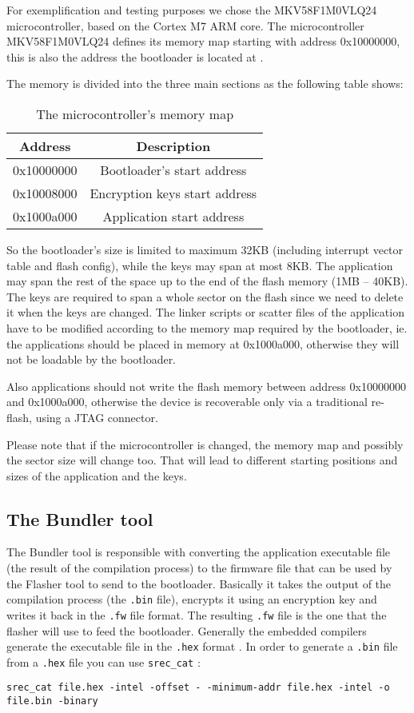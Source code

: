 \documentclass[10pt,a4paper,twoside]{article}
\begin{document}
For exemplification and testing purposes we chose the MKV58F1M0VLQ24 microcontroller, based on the Cortex M7 ARM core. The microcontroller MKV58F1M0VLQ24 defines its memory map starting with address 0x10000000, this is also the address the bootloader is located at \cite{kv5x}.

The memory is divided into the three main sections as the following table shows:
\begin{table}[h]
\begin{tabular}{ | c | c | }
        \hline
       \textbf{Address} & \textbf{Description} \\ \hline
0x10000000 & Bootloader’s start address \\ \hline
0x10008000 & Encryption keys start address \\ \hline
0x1000a000 & Application start address \\ \hline
    \end{tabular}
        \centering
    \caption{The microcontroller's memory map}
    \label{protoStruct}
\end{table}

So the bootloader’s size is limited to maximum 32KB (including interrupt vector table and flash config), while the keys may span at most 8KB. The application may span the rest of the space up to the end of the flash memory (1MB – 40KB).
The keys are required to span a whole sector on the flash since we need to delete it when the keys are changed.
The linker scripts or scatter files of the application have to be modified according to the memory map required by the bootloader, ie. the applications should be placed in memory at 0x1000a000, otherwise they will not be loadable by the bootloader.

Also applications should not write the flash memory between address 0x10000000 and 0x1000a000, otherwise the device is recoverable only via a traditional re-flash, using a JTAG connector.

Please note that if the microcontroller is changed, the memory map and possibly the sector size will change too. That will lead to different starting positions and sizes of the application and the keys.

\subsection{The Bundler tool}
The Bundler tool is responsible with converting the application executable file (the result of the compilation process) to the firmware file that can be used by the Flasher tool to send to the bootloader. Basically it takes the output of the compilation process (the \texttt{.bin} file), encrypts it using an encryption key and writes it back in the \texttt{.fw} file format. The resulting \texttt{.fw} file is the one that the flasher will use to feed the bootloader.
Generally the embedded compilers generate the executable file in the \texttt{.hex} format \cite{hex}. In order to generate a \texttt{.bin} file from a \texttt{.hex} file you can use \texttt{srec\_cat} \cite{srecord}:
\begin{verbatim}
srec_cat file.hex -intel -offset - -minimum-addr file.hex -intel -o file.bin -binary 
\end{verbatim}
\end{document}
